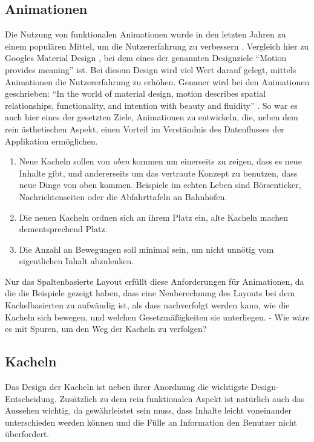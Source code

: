 \documentclass[12pt,twoside]{book}
\begin{document}
\subsection{Animationen}

Die Nutzung von funktionalen Animationen wurde in den letzten Jahren zu einem populären Mittel, um die Nutzererfahrung zu verbessern \cite{functionalanimations}. Vergleich hier zu Googles Material Design \cite{materialdesign}, bei dem eines der genannten Designziele ``Motion provides meaning'' ist. Bei diesem Design wird viel Wert darauf gelegt, mittels Animationen die Nutzererfahrung zu erhöhen. Genauer wird bei den Animationen geschrieben: ``In the world of material design, motion describes spatial relationships, functionality, and intention with beauty and fluidity'' \cite{materialdesign}.
So war es auch hier eines der gesetzten Ziele, Animationen zu entwickeln, die, neben dem rein ästhetischen Aspekt, einen Vorteil im Verständnis des Datenflusses der Applikation ermöglichen.

\begin{enumerate}
  \item Neue Kacheln sollen von \textit{oben} kommen um einerseits zu zeigen, dass es neue Inhalte gibt, und andererseits um das vertraute Konzept zu benutzen, dass neue Dinge von oben kommen. Beispiele im echten Leben sind Börsenticker, Nachrichtenseiten oder die Abfahrttafeln an Bahnhöfen.

  \item Die neuen Kacheln ordnen sich an ihrem Platz ein, alte Kacheln machen dementsprechend Platz.
  \item Die Anzahl an Bewegungen soll minimal sein, um nicht unnötig vom eigentlichen Inhalt abzulenken.
\end{enumerate}

Nur das Spaltenbasierte Layout erfüllt diese Anforderungen für Animationen, da die die Beispiele gezeigt haben, dass eine Neuberechnung des Layouts bei dem Kachelbasierten zu aufwändig ist, als dass nachverfolgt werden kann, wie die Kacheln sich bewegen, und welchen Gesetzmäßigkeiten sie unterliegen. - Wie wäre es mit Spuren, um den Weg der Kacheln zu verfolgen?

\subsection{Kacheln}\label{sec:tiles}

Das Design der Kacheln ist neben ihrer Anordnung die wichtigste Design-Entscheidung. Zusätzlich zu dem rein funktionalen Aspekt ist natürlich auch das Aussehen wichtig, da gewährleistet sein muss, dass Inhalte leicht voneinander unterschieden werden können und die Fülle an Information den Benutzer nicht überfordert.
\end{document}
